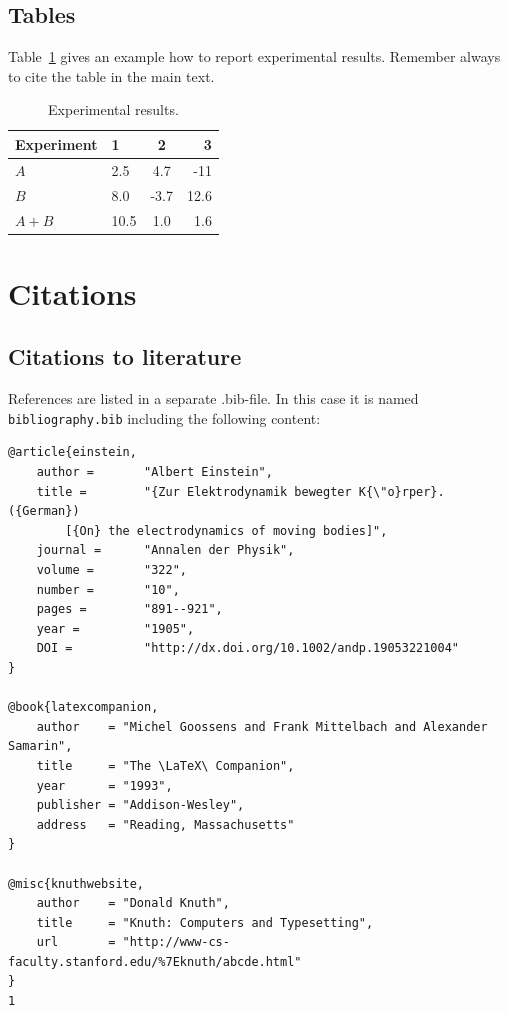 \section{Tables}

Table~\ref{table:results} gives an example how to report experimental results. Remember always to cite the table in the main text. 

\begin{table}
\centering
\caption{Experimental results.\label{table:results}}
\begin{tabular}{l||l c r} 
Experiment & 1 & 2 & 3 \\ 
\hline \hline 
$A$ & 2.5 & 4.7 & -11 \\
$B$ & 8.0 & -3.7 & 12.6 \\
$A+B$ & 10.5 & 1.0 & 1.6 \\
\hline
%
\end{tabular}
\end{table}

\chapter{Citations}

\section{Citations to literature}

References are listed in a separate .bib-file. In this case it is named \texttt{bibliography.bib} including the following content:
\begin{verbatim}
@article{einstein,
    author =       "Albert Einstein",
    title =        "{Zur Elektrodynamik bewegter K{\"o}rper}. ({German})
        [{On} the electrodynamics of moving bodies]",
    journal =      "Annalen der Physik",
    volume =       "322",
    number =       "10",
    pages =        "891--921",
    year =         "1905",
    DOI =          "http://dx.doi.org/10.1002/andp.19053221004"
}
 
@book{latexcompanion,
    author    = "Michel Goossens and Frank Mittelbach and Alexander Samarin",
    title     = "The \LaTeX\ Companion",
    year      = "1993",
    publisher = "Addison-Wesley",
    address   = "Reading, Massachusetts"
}
 
@misc{knuthwebsite,
    author    = "Donald Knuth",
    title     = "Knuth: Computers and Typesetting",
    url       = "http://www-cs-faculty.stanford.edu/%7Eknuth/abcde.html"
}
1
\end{verbatim}

